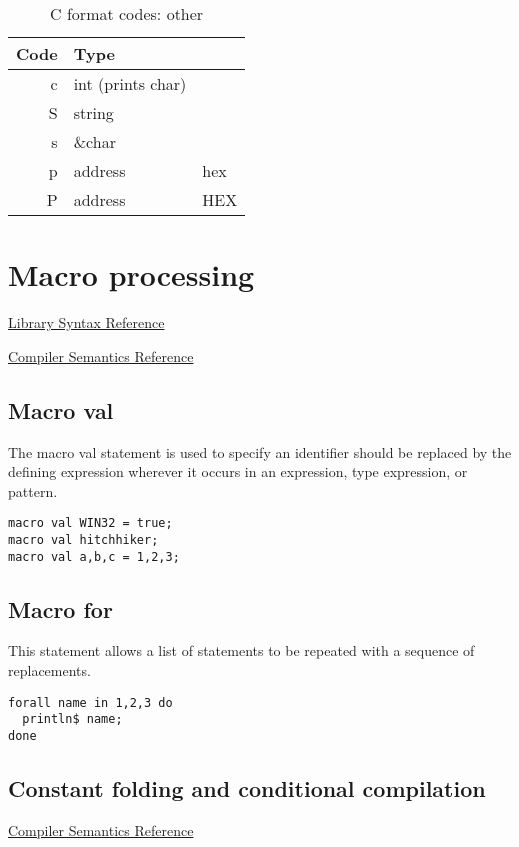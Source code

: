 \documentclass[oneside]{book}
\begin{document}
\begin{table}
\caption{C format codes: other\label{C format codes: other}}
\centering
\begin{tabular}[c]{rll}
Code&Type\\
\hline

c&int (prints char)\\

S&string\\
s&\&char\\
p&address&hex\\
P&address&HEX\\
\end{tabular}
\end{table}


\chapter{Macro processing}
\href{http://felix-lang.org/share/lib/grammar/macros.fsyn}{Library Syntax Reference}

\href{http://felix-lang.org/share/src/compiler/flx_desugar/flx_macro.ml}{Compiler Semantics Reference}

\section{Macro val}
The macro val statement is used to specify an identifier should
be replaced by the defining expression wherever it occurs in an
expression, type expression, or pattern.

\begin{verbatim}
macro val WIN32 = true;
macro val hitchhiker;
macro val a,b,c = 1,2,3;
\end{verbatim}


\section{Macro for}
This statement allows a list of statements to be repeated
with a sequence of replacements.

\begin{verbatim}
forall name in 1,2,3 do
  println$ name;
done
\end{verbatim}


\section{Constant folding and conditional compilation}
\href{http://felix-lang.org/share/src/compiler/flx_desugar/flx_constfld.ml}{Compiler Semantics Reference}
\end{document}
